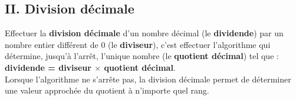 \newpage

\subsection*{II. Division décimale}

\begin{Définition*}
Effectuer la \textbf{division décimale} d'un nombre décimal (le \textbf{dividende}) par un nombre entier différent de $0$ (le \textbf{diviseur}), c'est effectuer l'algorithme qui détermine, jusqu'à l'arrêt, l'unique nombre (le \textbf{quotient décimal}) tel que : \textcolor{Couleur6}{\textbf{dividende = diviseur $\times$ quotient décimal}}.\\
Lorsque l'algorithme ne s'arrête pas, la division décimale permet de déterminer une valeur approchée du quotient à n'importe quel rang.
\end{Définition*}


